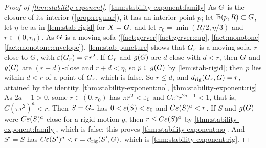 \begin{proof}[Proof of \cref{thm:stability-exponent}]
\ref{thm:stability-exponent:family} As $G$ is the closure of its interior
(\cref{prop:regular}), it has an interior point $p$; let
$\mathbb B(p,R)\subset G$, let $\eta$ be as in \cref{lem:stab-rigid} for
$X=G$, and let $r_0=\min(R/2,\eta/3)$ and $r\in(0,r_0)$. As $G$ is a
moving sofa (\cref{fact:gerver}\ref{fact:gerver:cap},
\cref{fact:monotone}\ref{fact:monotone:envelope}), \cref{lem:stab-puncture}
shows that $G_r$ is a moving sofa, $r$-close to $G$, with
$\varepsilon(G_r)=\pi r^2$. If $G_r$ and $g(G)$ are $d$-close with $d<r$, then
$G$ and $g(G)$ are $(r+d)$-close and $r+d<\eta$, so $p\in g(G)$ by
\cref{lem:stab-rigid}; then $p$ lies within $d<r$ of a point of $G_r$, which
is false. So $r\le d$, and $d_{\mathrm{rig}}(G_r,G)=r$, attained by the
identity. \ref{thm:stability-exponent:no}, \ref{thm:stability-exponent:rig}
As $2a-1>0$, some $r\in(0,r_0)$ has $\pi r^2<\varepsilon_0$ and
$C\pi^ar^{2a-1}<1$, that is, $C(\pi r^2)^a<r$. Then $S=G_r$ has
$0<\varepsilon(S)<\varepsilon_0$ and $C\varepsilon(S)^a<r$. If $S$ and $g(G)$ were
$C\varepsilon(S)^a$-close for a rigid motion $g$, then $r\le C\varepsilon(S)^a$ by
\ref{thm:stability-exponent:family}, which is false; this proves
\ref{thm:stability-exponent:no}. And $S'=S$ has
$C\varepsilon(S')^a<r=d_{\mathrm{rig}}(S',G)$, which is
\ref{thm:stability-exponent:rig}.
\end{proof}
